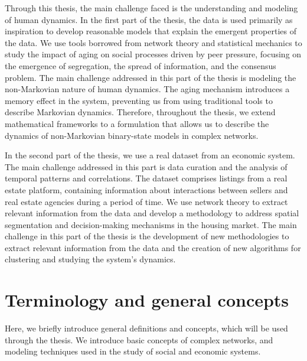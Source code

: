 Through this thesis, the main challenge faced is the understanding and modeling of human dynamics. In the first part of the thesis, the data is used primarily as inspiration to develop reasonable models that explain the emergent properties of the data. We use tools borrowed from network theory and statistical mechanics to study the impact of aging on social processes driven by peer pressure, focusing on the emergence of segregation, the spread of information, and the consensus problem. The main challenge addressed in this part of the thesis is modeling the non-Markovian nature of human dynamics. The aging mechanism introduces a memory effect in the system, preventing us from using traditional tools to describe Markovian dynamics. Therefore, throughout the thesis, we extend mathematical frameworks to a formulation that allows us to describe the dynamics of non-Markovian binary-state models in complex networks.

In the second part of the thesis, we use a real dataset from an economic system. The main challenge addressed in this part is data curation and the analysis of temporal patterns and correlations. The dataset comprises listings from a real estate platform, containing information about interactions between sellers and real estate agencies during a period of time. We use network theory to extract relevant information from the data and develop a methodology to address spatial segmentation and decision-making mechanisms in the housing market. The main challenge in this part of the thesis is the development of new methodologies to extract relevant information from the data and the creation of new algorithms for clustering and studying the system's dynamics.

\section{\label{sec:Terminology and general concepts} Terminology and general concepts}

Here, we briefly introduce general definitions and concepts, which will be used through the thesis. We introduce basic concepts of complex networks, and modeling techniques used in the study of social and economic systems.
